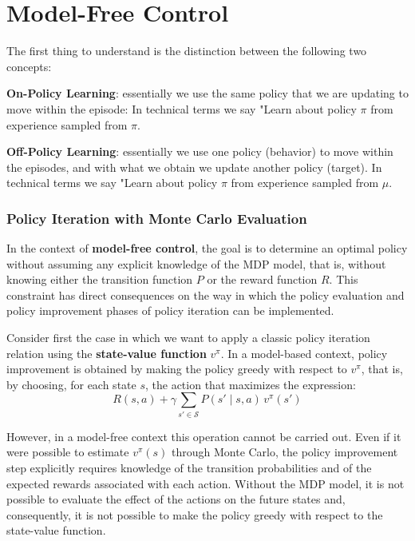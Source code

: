 \chapter{Model-Free Control}

The first thing to understand is the distinction between the following two concepts:
\begin{compactitemize}
    \item \textbf{On-Policy Learning}: essentially we use the same policy that we are updating to move within the episode: In technical terms we say "Learn about policy $\pi$ from experience sampled from $\pi$.
    \item \textbf{Off-Policy Learning}: essentially we use one policy (behavior) to move within the episodes, and with what we obtain we update another policy (target). In technical terms we say "Learn about policy $\pi$ from experience sampled from $\mu$.
\end{compactitemize}

\subsection{Policy Iteration with Monte Carlo Evaluation}

In the context of \textbf{model-free control}, the goal is to determine an optimal policy without assuming any explicit knowledge of the MDP model, that is, without knowing either the transition function $P$ or the reward function $R$. This constraint has direct consequences on the way in which the policy evaluation and policy improvement phases of policy iteration can be implemented.

Consider first the case in which we want to apply a classic policy iteration relation using the \textbf{state-value function} $v^\pi$. In a model-based context, policy improvement is obtained by making the policy greedy with respect to $v^\pi$, that is, by choosing, for each state $s$, the action that maximizes the expression:
\[
R(s,a) + \gamma \sum_{s' \in \mathcal{S}} P(s' \mid s,a)\, v^\pi(s')
\]

However, in a model-free context this operation cannot be carried out. Even if it were possible to estimate $v^\pi(s)$ through Monte Carlo, the policy improvement step explicitly requires knowledge of the transition probabilities and of the expected rewards associated with each action. Without the MDP model, it is not possible to evaluate the effect of the actions on the future states and, consequently, it is not possible to make the policy greedy with respect to the state-value function.

